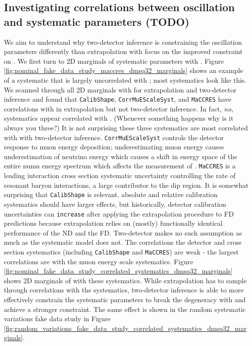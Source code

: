 \documentclass{article}
\begin{document}
\subsection{Investigating correlations between oscillation and systematic parameters (TODO)}
\label{sec:investigating_correlations_between_oscillation_and_systematic_parameters}
We aim to understand why two-detector inference is constraining the oscillation parameters differently than extrapolation with focus on the improved constraint on . We first turn to 2D marginals of systematic parameters with . Figure \ref{fig:nominal_fake_data_study_maccres_dmsq32_marginals} shows an example of a systematic that is largely uncorrelated with ; most systematics look like this. We scanned through all 2D marginals with  for extrapolation and two-detector inference and found that \texttt{Calib\-Shape}, \texttt{Corr\-MuE\-Scale\-Syst}, and \texttt{Ma\-CC\-RES} have correlations with  in extrapolation but not two-detector inference. In fact, \textit{no}, systematics appear correlated with . (Whenever something happens why is it always you three?) It is not surprising these three systematics are most correlated with  with two-detector inference. \texttt{Corr\-MuE\-Scale\-Syst} controls the detector response to muon energy deposition; underestimating muon energy causes underestimation of neutrino energy which causes a shift in energy space of the entire numu energy spectrum which affects the measurement of . \texttt{Ma\-CC\-RES} is a leading interaction cross section systematic uncertainty controlling the rate of resonant baryon interactions, a large contributor to the dip region. It is somewhat surprising that \texttt{Calib\-Shape} is relevant. absolute and relative calibration systematics should have larger effects, but historically, detector calibration uncertainties can \texttt{increase} after applying the extrapolation procedure to FD predictions because extrapolation relies on (mostly) functionally identical performance of the ND and the FD. Two-detector makes no such assumption as much as the systematic model does not. The correlations the detector and cross section systematics (including \texttt{Calib\-Shape} and \texttt{Ma\-CC\-RES}) are weak - the largest correlations are with the muon energy scale systematics. Figure \ref{fig:nominal_fake_data_study_correlated_systematics_dmsq32_marginals} shows 2D marginals of  with these systematics. While extrapolation has to sample through correlations with the systematics, two-detector inference is able to more effectively constrain the systematic parameters to break the degeneracy with  and achieve a stronger constraint. The same effect is shown in the random systematic variations fake data study in Figure \ref{fig:random_variations_fake_data_study_correlated_systematics_dmsq32_marginals}.
\end{document}
